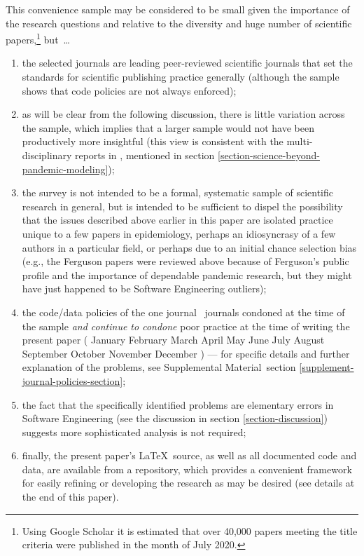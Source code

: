 \documentclass[10pt,a4paper]{article}
\def\supplement{Supplemental Material}
\def\plural#1#2{\ifnum #1=1 
	one #2%
\else
	\the#1\ #2s%
\fi}
\def\monthname#1{\ifcase#1 \or 
January\or 
February\or 
March\or 
April\or 
May\or 
June\or 
July\or 
August\or 
September\or 
October\or 
November\or 
December\fi}
\begin{document}
This convenience sample may be considered to be small given the importance of the research questions and relative to the diversity and huge number of scientific papers,\footnote{Using Google Scholar it is estimated that over 40,000 papers meeting the title criteria were published in the month of July 2020.} but~\ldots

\begin{enumerate}
\item the selected journals are leading peer-reviewed scientific journals that set the standards for scientific publishing practice generally (although the sample shows that code policies are not always enforced); 

\item as will be clear from the following discussion, there is little variation across the sample, which implies that a larger sample would not have been productively more insightful (this view is consistent with the multi-disciplinary reports in \cite{nature-review}, mentioned in section \ref{section-science-beyond-pandemic-modeling}); 

\item the survey is not intended to be a formal, systematic sample of scientific research in general, but is intended to be sufficient to dispel the possibility that the issues described above earlier in this paper are isolated practice unique to a few papers in epidemiology, perhaps an idiosyncrasy of a few authors in a particular field, or perhaps due to an initial chance selection bias (e.g., the Ferguson papers were reviewed above because of Ferguson's public profile and the importance of dependable pandemic research, but they might have just happened to be Software Engineering outliers);

\item the code/data policies of the \plural{\numberOfJournals}{journal} condoned at the time of the sample \emph{and continue to condone\/} poor practice at the time of writing the present paper (\monthname{\month} \the\year) --- for specific details and further explanation of the problems, see \supplement\ section \ref{supplement-journal-policies-section};

\item
the fact that the specifically identified problems are elementary errors in Software Engineering (see the discussion in section \ref{section-discussion}) suggests more sophisticated analysis is not required;

\item 
finally, the present paper's \LaTeX\ source, as well as all documented code and data, are available from a repository, which provides a convenient framework for easily refining or developing the research as may be desired (see details at the end of this paper).
\end{enumerate}
\end{document}
